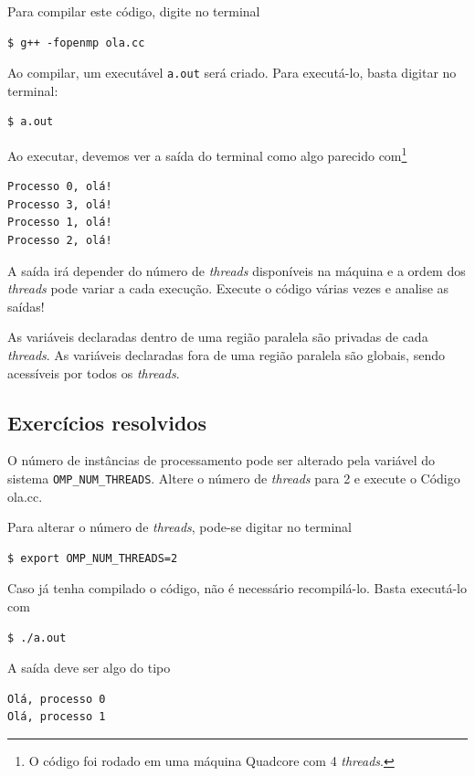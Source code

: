 Para compilar este código, digite no terminal
\begin{verbatim}
$ g++ -fopenmp ola.cc
\end{verbatim}

Ao compilar, um executável \verb+a.out+ será criado. Para executá-lo, basta digitar no terminal:
\begin{verbatim}
$ a.out
\end{verbatim}

Ao executar, devemos ver a saída do terminal como algo parecido com\footnote{O código foi rodado em uma máquina Quadcore com 4 {\it threads}.}
\begin{verbatim}
Processo 0, olá!
Processo 3, olá!
Processo 1, olá!
Processo 2, olá!
\end{verbatim}

A saída irá depender do número de {\it threads} disponíveis na máquina e a ordem dos {\it threads} pode variar a cada execução. Execute o código várias vezes e analise as saídas!

\begin{obs}
  As variáveis declaradas dentro de uma região paralela são privadas de cada {\it threads}. As variáveis declaradas fora de uma região paralela são globais, sendo acessíveis por todos os {\it threads}.
\end{obs}

\subsection*{Exercícios resolvidos}

\begin{exeresol}
  O número de instâncias de processamento pode ser alterado pela variável do sistema \verb+OMP_NUM_THREADS+. Altere o número de {\it threads} para 2 e execute o Código ola.cc.
\end{exeresol}
\begin{resol}
  Para alterar o número de {\it threads}, pode-se digitar no terminal
\begin{verbatim}
$ export OMP_NUM_THREADS=2
\end{verbatim}
  Caso já tenha compilado o código, não é necessário recompilá-lo. Basta executá-lo com
\begin{verbatim}
$ ./a.out
\end{verbatim}
  A saída deve ser algo do tipo
\begin{verbatim}
Olá, processo 0
Olá, processo 1
\end{verbatim}
\end{resol}

